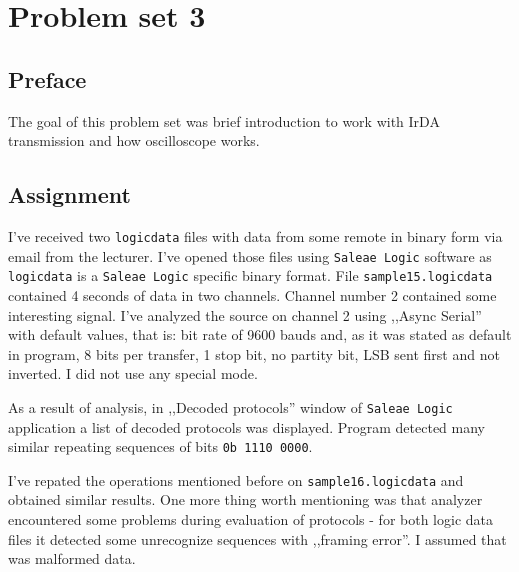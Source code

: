 \section{Problem set 3}
\subsection{Preface}

The goal of this problem set was brief introduction to work with IrDA transmission
and how oscilloscope works.

\subsection{Assignment}

I've received two \texttt{logicdata} files with data from some remote in binary form
via email from the lecturer. I've opened those files using \texttt{Saleae Logic}
software as \texttt{logicdata} is a \texttt{Saleae Logic} specific binary format.
File \texttt{sample15.logicdata} contained 4 seconds of data in two channels.
Channel number 2 contained some interesting signal. I've analyzed the source on
channel 2 using ,,Async Serial'' with default values, that is: bit rate of
9600 bauds and, as it was stated as default in program, 8 bits per transfer,
1 stop bit, no partity bit, LSB sent first and not inverted. I did not use any
special mode.

As a result of analysis, in ,,Decoded protocols'' window of \texttt{Saleae Logic}
application a list of decoded protocols was displayed. Program detected many
similar repeating sequences of bits \texttt{0b 1110 0000}.

I've repated the operations mentioned before on \texttt{sample16.logicdata} and
obtained similar results. One more thing worth mentioning was that analyzer
encountered some problems during evaluation of protocols - for both logic data
files it detected some unrecognize sequences with ,,framing error''. I assumed
that was malformed data.
